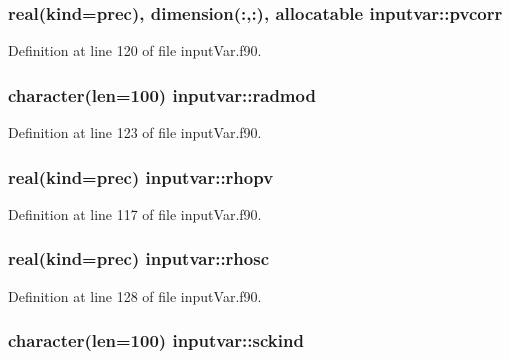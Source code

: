 \hypertarget{classinputvar_aaa751e7b478966be1287687d4899ca3f}{
\subsubsection[{pvcorr}]{\setlength{\rightskip}{0pt plus 5cm}real(kind=prec), dimension(\-:,\-:), allocatable inputvar\-::pvcorr}}\label{classinputvar_aaa751e7b478966be1287687d4899ca3f}


Definition at line 120 of file input\-Var.\-f90.

\hypertarget{classinputvar_a45e665d3fff6479724af6fcb9819f779}{
\subsubsection[{radmod}]{\setlength{\rightskip}{0pt plus 5cm}character(len=100) inputvar\-::radmod}}\label{classinputvar_a45e665d3fff6479724af6fcb9819f779}


Definition at line 123 of file input\-Var.\-f90.

\hypertarget{classinputvar_a912165017f8566044a451c888ab58c60}{
\subsubsection[{rhopv}]{\setlength{\rightskip}{0pt plus 5cm}real(kind=prec) inputvar\-::rhopv}}\label{classinputvar_a912165017f8566044a451c888ab58c60}


Definition at line 117 of file input\-Var.\-f90.

\hypertarget{classinputvar_aac32027dc5d095e6dcb9088dec220274}{
\subsubsection[{rhosc}]{\setlength{\rightskip}{0pt plus 5cm}real(kind=prec) inputvar\-::rhosc}}\label{classinputvar_aac32027dc5d095e6dcb9088dec220274}


Definition at line 128 of file input\-Var.\-f90.

\hypertarget{classinputvar_a1690adffbcaeb3cbd73051d411d2a376}{
\subsubsection[{sckind}]{\setlength{\rightskip}{0pt plus 5cm}character(len=100) inputvar\-::sckind}}\label{classinputvar_a1690adffbcaeb3cbd73051d411d2a376}


